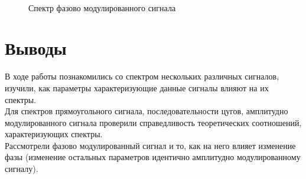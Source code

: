 \documentclass[a4paper, 12pt]{article}%
\begin{document}
 	\begin{figure}[H]
 		\centering
 			\\
 		\qquad
 		    		\caption{Спектр фазово модулированного сигнала}	
 	\end{figure}
 	\section{Выводы}
 	В ходе работы познакомились со спектром нескольких различных сигналов, изучили, как параметры характеризующие данные сигналы влияют на их спектры.\\
 	Для спектров прямоугольного сигнала, последовательности цугов, амплитудно модулированного сигнала проверили справедливость теоретических соотношений, характеризующих спектры.\\
 	Рассмотрели фазово модулированный сигнал и то, как на него влияет изменение фазы (изменение остальных параметров идентично амплитудно модулированному сигналу).
\end{document}
